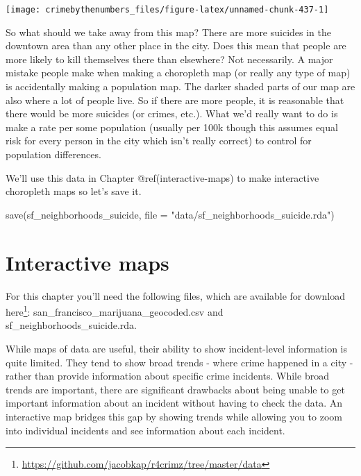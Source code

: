 \documentclass[
  a4paper,
]{krantz}
\makeatletter
\newenvironment{Shaded}{\begin{snugshade}}{\end{snugshade}}
\newcommand{\AttributeTok}[1]{\textcolor[rgb]{0.77,0.63,0.00}{#1}}
\newcommand{\FunctionTok}[1]{\textcolor[rgb]{0.00,0.00,0.00}{#1}}
\newcommand{\NormalTok}[1]{#1}
\newcommand{\StringTok}[1]{\textcolor[rgb]{0.31,0.60,0.02}{#1}}
\renewcommand{\href}[2]{#2\footnote{\url{#1}}}
\newenvironment{kframe}{%
\medskip{}
\setlength{\fboxsep}{.8em}
 \def\at@end@of@kframe{}%
 \ifinner\ifhmode%
  \def\at@end@of@kframe{\end{minipage}}%
  \begin{minipage}{\columnwidth}%
 \fi\fi%
 \def\FrameCommand##1{\hskip\@totalleftmargin \hskip-\fboxsep
 \colorbox{shadecolor}{##1}\hskip-\fboxsep
     \hskip-\linewidth \hskip-\@totalleftmargin \hskip\columnwidth}%
 \MakeFramed {\advance\hsize-\width
   \@totalleftmargin\z@ \linewidth\hsize
   \@setminipage}}%
 {\par\unskip\endMakeFramed%
 \at@end@of@kframe}
\renewenvironment{Shaded}{\begin{kframe}}{\end{kframe}}
\makeatother
\begin{document}
\begin{center}\texttt{[image: crimebythenumbers\_files/figure-latex/unnamed-chunk-437-1]} \end{center}

So what should we take away from this map? There are more
suicides in the downtown area than any other place in the
city. Does this mean that people are more likely to kill
themselves there than elsewhere? Not necessarily. A major
mistake people make when making a choropleth map (or really
any type of map) is accidentally making a population map.
The darker shaded parts of our map are also where a lot of
people live. So if there are more people, it is reasonable
that there would be more suicides (or crimes, etc.). What
we'd really want to do is make a rate per some population
(usually per 100k though this assumes equal risk for every
person in the city which isn't really correct) to control
for population differences.

We'll use this data in Chapter @ref(interactive-maps) to
make interactive choropleth maps so let's save it.

\begin{Shaded}
\begin{Highlighting}[]
\FunctionTok{save}\NormalTok{(sf\_neighborhoods\_suicide, }\AttributeTok{file =} \StringTok{"data/sf\_neighborhoods\_suicide.rda"}\NormalTok{)}
\end{Highlighting}
\end{Shaded}

\hypertarget{interactive-maps}{%
\chapter{Interactive maps}\label{interactive-maps}}

For this chapter you'll need the following files, which are
available for download
\href{https://github.com/jacobkap/r4crimz/tree/master/data}{here}:
san\_francisco\_marijuana\_geocoded.csv and
sf\_neighborhoods\_suicide.rda.

While maps of data are useful, their ability to show
incident-level information is quite limited. They tend to
show broad trends - where crime happened in a city - rather
than provide information about specific crime incidents.
While broad trends are important, there are significant
drawbacks about being unable to get important information
about an incident without having to check the data. An
interactive map bridges this gap by showing trends while
allowing you to zoom into individual incidents and see
information about each incident.
\end{document}
